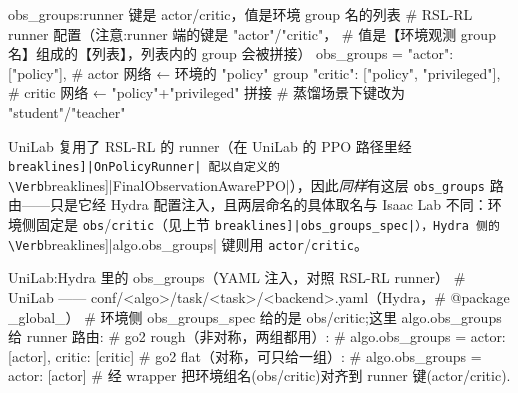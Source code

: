\begin{codebox}[Python]{obs\_groups:runner 键是 actor/critic，值是环境 group 名的列表}
# RSL-RL runner 配置（注意:runner 端的键是 "actor"/"critic"，
# 值是【环境观测 group 名】组成的【列表】，列表内的 group 会被拼接）
obs_groups = {
    "actor":  ["policy"],               # actor 网络 ← 环境的 "policy" group
    "critic": ["policy", "privileged"], # critic 网络 ← "policy"+"privileged" 拼接
}
# 蒸馏场景下键改为 "student"/"teacher"
\end{codebox}

UniLab 复用了 RSL-RL 的 runner（在 UniLab 的 PPO 路径里经 \Verb[breaklines]|OnPolicyRunner| 配以自定义的 \Verb[breaklines]|FinalObservationAwarePPO|），因此\emph{同样}有这层 \verb|obs_groups| 路由——只是它经 Hydra 配置注入，且两层命名的具体取名与 Isaac Lab 不同：环境侧固定是 \verb|obs|/\allowbreak\verb|critic|（见上节 \Verb[breaklines]|obs_groups_spec|），Hydra 侧的 \Verb[breaklines]|algo.obs_groups| 键则用 \verb|actor|/\allowbreak\verb|critic|。

\begin{codebox}[Python]{UniLab:Hydra 里的 obs\_groups（YAML 注入，对照 RSL-RL runner）}
# UniLab —— conf/<algo>/task/<task>/<backend>.yaml（Hydra，# @package _global_）
# 环境侧 obs_groups_spec 给的是 obs/critic;这里 algo.obs_groups 给 runner 路由:
# go2 rough（非对称，两组都用）:
#   algo.obs_groups = {actor: [actor], critic: [critic]}
# go2 flat（对称，可只给一组）:
#   algo.obs_groups = {actor: [actor]}
# 经 wrapper 把环境组名(obs/critic)对齐到 runner 键(actor/critic).
\end{codebox}


